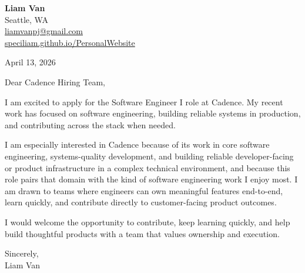 \documentclass[letterpaper,11pt]{article}
\begin{document}
\begin{flushleft}
\textbf{\Large Liam Van} \\
Seattle, WA \\
\href{mailto:liamvanpj@gmail.com}{liamvanpj@gmail.com} \\
\href{https://speciliam.github.io/PersonalWebsite}{speciliam.github.io/PersonalWebsite}
\end{flushleft}

April 13, 2026

\noindent Dear Cadence Hiring Team,

\noindent I am excited to apply for the Software Engineer I role at Cadence. My recent work has focused on software engineering, building reliable systems in production, and contributing across the stack when needed.

\noindent I am especially interested in Cadence because of its work in core software engineering, systems-quality development, and building reliable developer-facing or product infrastructure in a complex technical environment, and because this role pairs that domain with the kind of software engineering work I enjoy most. I am drawn to teams where engineers can own meaningful features end-to-end, learn quickly, and contribute directly to customer-facing product outcomes.

\noindent I would welcome the opportunity to contribute, keep learning quickly, and help build thoughtful products with a team that values ownership and execution.

\noindent Sincerely, \\
Liam Van
\end{document}
